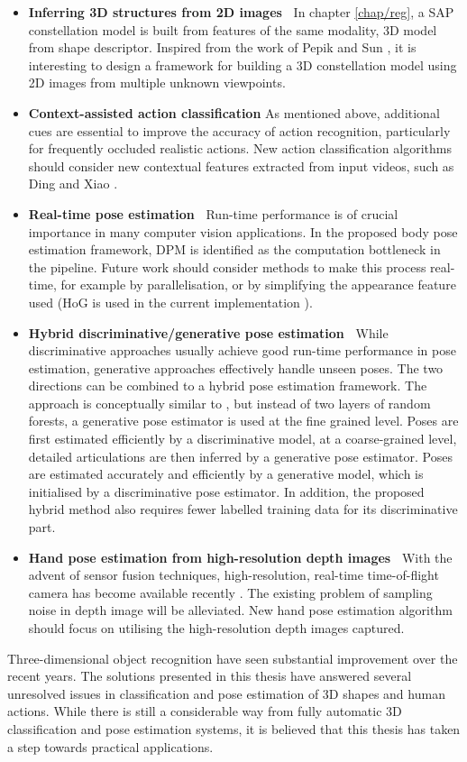\begin{itemize}
	\item \textbf{Inferring 3D structures from 2D images~} 
		In chapter \ref{chap/reg}, a SAP constellation model is built from features of the same modality, \eg 3D model from shape descriptor. Inspired from the work of Pepik \etal \cite{Pepik2012} and Sun \etal \cite{Sun2009}, it is interesting to design a framework for building a 3D constellation model using 2D images from multiple unknown viewpoints.  
	\item \textbf{Context-assisted action classification} As mentioned above, additional cues are essential to improve the accuracy of action recognition, particularly for frequently occluded realistic actions. New action classification algorithms should consider new contextual features extracted from input videos, such as Ding and Xiao \cite{Ding2012}.   
	\item \textbf{Real-time pose estimation~} Run-time performance is of crucial importance in many computer vision applications. In the proposed body pose estimation framework, DPM is identified as the computation bottleneck in the pipeline. Future work should consider methods to make this process real-time, for example by parallelisation, or by simplifying the appearance feature used (HoG is used in the current implementation \cite{Yang2011}).  
	\item \textbf{Hybrid discriminative/generative pose estimation~} While discriminative approaches usually achieve good run-time performance in pose estimation, generative approaches effectively handle unseen poses. The two directions can be combined to a hybrid pose estimation framework. The approach is conceptually similar to \cite{Keskin2012}, but instead of two layers of random forests, a generative pose estimator is used at the fine grained level. Poses are first estimated efficiently by a discriminative model, at a coarse-grained level, detailed articulations are then inferred by a generative pose estimator. Poses are estimated accurately and efficiently by a generative model, which is initialised by a discriminative pose estimator. In addition, the proposed hybrid method also requires fewer labelled training data for its discriminative part. 
	\item \textbf{Hand pose estimation from high-resolution depth images~} With the advent of sensor fusion techniques, high-resolution, real-time time-of-flight camera has become available recently \cite{Nair2012}. The existing problem of sampling noise in depth image will be alleviated. New hand pose estimation algorithm should focus on utilising the high-resolution depth images captured.    
\end{itemize}

Three-dimensional object recognition have seen substantial improvement over the recent years.
The solutions presented in this thesis have answered several unresolved issues in classification and pose estimation of 3D shapes and human actions. While there is still a considerable way from fully automatic 3D classification and pose estimation systems, it is believed that this thesis has taken a step towards practical applications.  
